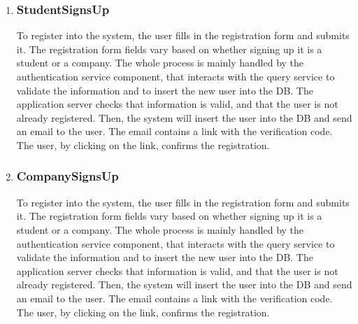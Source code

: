 \begin{enumerate}[label=\textbf{RV\arabic* -}]

\item \subsubsection{StudentSignsUp}

To register into the system, the user fills in the registration form and submits it.
The registration form fields vary based on whether signing up it is a student or a company.
The whole process is mainly handled by the authentication service component, that interacts with the query service to validate the information and to insert the new user into the DB.
The application server checks that information is valid, and that the user is not already registered.
Then, the system will insert the user into the DB and send an email to the user.
The email contains a link with the verification code.
The user, by clicking on the link, confirms the registration.

\begin{figure}[H]
    \centering
\end{figure}

\item \subsubsection{CompanySignsUp}

To register into the system, the user fills in the registration form and submits it.
The registration form fields vary based on whether signing up it is a student or a company.
The whole process is mainly handled by the authentication service component, that interacts with the query service to validate the information and to insert the new user into the DB.
The application server checks that information is valid, and that the user is not already registered.
Then, the system will insert the user into the DB and send an email to the user.
The email contains a link with the verification code.
The user, by clicking on the link, confirms the registration.


\end{enumerate}
